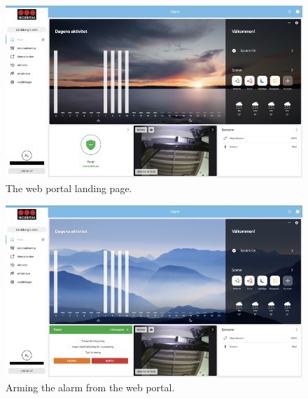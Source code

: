 \begin{figure}[!ht]
    \centering
    \includegraphics[width=\textwidth]{images/3-system/landing-page-web.png}
    \caption{The web portal landing page.}
    \label{fig:web-landing-page}
\end{figure}
\begin{figure}[!ht]
    \centering
    \includegraphics[width=\textwidth]{images/3-system/arming-web.png}
    \caption{Arming the alarm from the web portal.}
    \label{fig:web-arming}
\end{figure}

